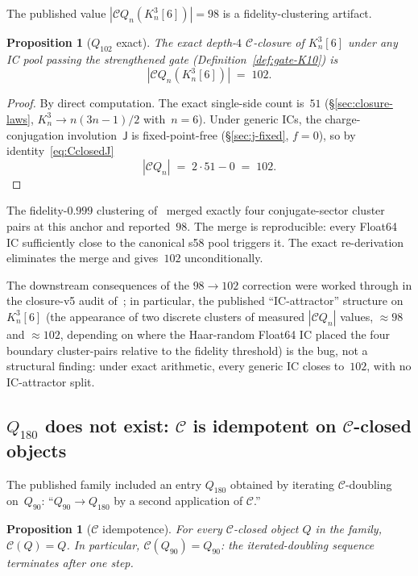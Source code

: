 \documentclass[12pt,a4paper]{article}
\newtheorem{proposition}[theorem]{Proposition}
\theoremstyle{definition}
\theoremstyle{remark}
\newcommand{\Kn}{K_n^3}
\newcommand{\Qn}{Q_n}
\newcommand{\Ccls}{\mathcal{C}}             %
\newcommand{\Jconj}{\mathsf{J}}             %
\begin{document}
The published value $|\Ccls\Qn(\Kn[6])| = 98$ is a fidelity-clustering
artifact.

\begin{proposition}[$Q_{102}$ exact]\label{prop:Q102-exact}
The exact depth-$4$ $\Ccls$-closure of $\Kn[6]$ under any IC pool
passing the strengthened gate (Definition~\ref{def:gate-K10}) is
\[
|\Ccls\Qn(\Kn[6])| \;=\; 102.
\]
\end{proposition}

\begin{proof}
By direct computation. The exact single-side count is~$51$
(\S\ref{sec:closure-laws}, $\Kn \to n(3n{-}1)/2$ with~$n=6$). Under
generic ICs, the charge-conjugation involution~$\Jconj$ is
fixed-point-free (\S\ref{sec:j-fixed}, $f=0$), so by
identity~\eqref{eq:CclosedJ}
\[
|\Ccls\Qn| \;=\; 2 \cdot 51 - 0 \;=\; 102.
\]
\end{proof}

The fidelity-$0.999$ clustering of~\cite{CFSpipeline2026} merged
exactly four conjugate-sector cluster pairs at this anchor and
reported~$98$. The merge is reproducible: every Float64 IC
sufficiently close to the canonical s58 pool triggers it. The
exact re-derivation eliminates the merge and gives~$102$
unconditionally.

The downstream consequences of the $98 \to 102$ correction were
worked through in the closure-v5 audit
of~\cite{closure-v5-audit-fidelity}; in particular, the published
``IC-attractor'' structure on $\Kn[6]$ (the appearance of two
discrete clusters of measured $|\Ccls\Qn|$ values, $\approx 98$ and
$\approx 102$, depending on where the Haar-random Float64 IC placed
the four boundary cluster-pairs relative to the fidelity threshold)
is the bug, not a structural finding: under exact arithmetic, every
generic IC closes to~$102$, with no IC-attractor split.



\subsection{$Q_{180}$ does not exist: $\Ccls$ is idempotent on $\Ccls$-closed objects}
\label{sec:reground-Q180}

The published family included an entry $Q_{180}$ obtained by
iterating $\Ccls$-doubling on~$Q_{90}$: ``$Q_{90} \to Q_{180}$ by a
second application of $\Ccls$.''

\begin{proposition}[$\Ccls$ idempotence]\label{prop:C-idempotent}
For every $\Ccls$-closed object $Q$ in the family, $\Ccls(Q) = Q$.
In particular, $\Ccls(Q_{90}) = Q_{90}$: the iterated-doubling
sequence terminates after one step.
\end{proposition}
\end{document}
